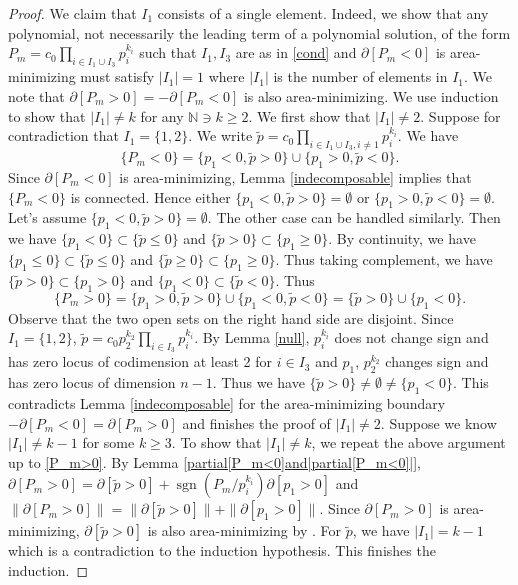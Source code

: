 \documentclass[pdflatex,sn-mathphys-num]{sn-jnl}%
\theoremstyle{thmstyleone}%
\theoremstyle{thmstyletwo}%
\theoremstyle{thmstylethree}%
\newcommand{\N}{\mathbb{N}}
\DeclareMathOperator{\sgn}{sgn}
\begin{document}
\begin{proof}
	We claim that $I_1$ consists of a single element. Indeed, we show that any polynomial, not necessarily the leading term of a polynomial solution, of the form $P_m=c_0\prod_{i\in I_1\cup I_3}p_i^{k_i}$ such that $I_1,I_3$ are as in \eqref{cond} and $\partial [P_m<0]$ is area-minimizing must satisfy  $|I_1|=1$ where $|I_1|$ is the number of elements in $I_1$. We note that $\partial[P_m>0]=-\partial[P_m<0]$ is also area-minimizing. We use induction to show that $|I_1|\neq k$ for any $\N\ni k\ge 2$. We first show that $|I_1|\neq 2$. Suppose for contradiction that $I_1=\{1,2\}$. We write $\tilde p=c_0\prod_{i\in I_1\cup I_3,i\neq 1}p_i^{k_i}$. We have \[\{P_m<0\}=\{p_1<0,\tilde p>0\}\cup \{p_1>0,\tilde p<0\}.\]  Since $\partial [P_m<0]$ is area-minimizing, Lemma \ref{indecomposable} implies that $\{P_m<0\}$ is connected. Hence either $\{p_1<0,\tilde p>0\}=\emptyset$ or $\{p_1>0,\tilde p<0\}=\emptyset$. Let's assume $\{p_1<0,\tilde p>0\}=\emptyset$. The other case can be handled similarly. Then we have $\{p_1<0\}\subset \{\tilde p\le0\}$ and $\{\tilde p>0\}\subset \{p_1\ge0\}$. By continuity, we have $\{p_1\le 0\}\subset \{\tilde p\le0\}$ and $\{\tilde p\ge 0\}\subset \{p_1\ge0\}$. Thus taking complement, we have $\{\tilde p>0\}\subset \{p_1>0\}$ and $\{p_1<0\}\subset \{\tilde p<0\}$. Thus \begin{equation}\label{P_m>0}
	    \{P_m>0\}=\{p_1>0,\tilde p>0\}\cup \{p_1<0,\tilde p<0\}=\{\tilde p>0\}\cup\{ p_1<0\}.
	\end{equation} Observe that the two open sets on the right hand side are disjoint. Since $I_1=\{1,2\} $, $\tilde p=c_0p_2^{k_2}\prod_{i\in I_3}p_i^{k_i}$. By Lemma \ref{null}, $p_i^{k_i}$ does not change sign and has zero locus of codimension at least 2 for $i\in I_3$ and $p_1$, $p_2^{k_2}$ changes sign and has zero locus of dimension $n-1$. Thus we have $\{\tilde p>0\}\neq\emptyset\neq \{p_1<0\}$.  This contradicts Lemma \ref{indecomposable} for the area-minimizing boundary $-\partial[P_m<0]=\partial[P_m>0]$ and finishes the proof of $|I_1|\neq 2$. Suppose we know $|I_1|\neq k-1$ for some $k\ge 3$. To show that $|I_1|\neq k$, we repeat the above argument up to \eqref{P_m>0}. By Lemma \ref{partial[P_m<0]and|partial[P_m<0]|}, $\partial[P_m>0]=\partial [\tilde p>0]+\sgn (P_m/p_i^{k_i})\partial [p_1>0]$ and $\|\partial[P_m>0]\|=\|\partial [\tilde p>0]\|+\|\partial [p_1>0]\|$. Since $\partial [P_m>0]$ is area-minimizing, $\partial [\tilde p>0]$ is also area-minimizing by \cite[Lemma 33.4]{Sim}. For $\tilde p$, we have $|I_1|=k-1$ which is a contradiction to the induction hypothesis. This finishes the induction.



\end{proof}
\end{document}
